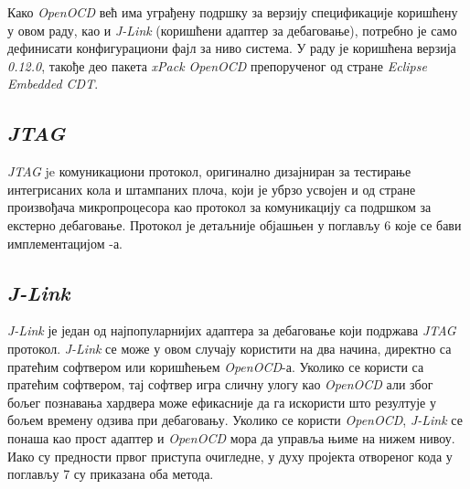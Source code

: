 Како \textit{Open\acrshort{OCD}} већ има уграђену подршку за верзију спецификације \cite{debug_spec} коришћену у овом раду, као и \textit{J-Link} (коришћени адаптер за дебаговање), потребно је само дефинисати конфигурациони фајл за ниво система. У раду је коришћена верзија \textit{0.12.0}, такође део пакета \textit{xPack OpenOCD} препорученог од стране \textit{Eclipse Embedded CDT}.

\subsection{\textit{\acrshort{JTAG}}}

\textit{\acrfull{JTAG}} \cite{jtag_spec} je комуникациони протокол, оригинално дизајниран за тестирање интегрисаних кола и штампаних плоча, који је убрзо усвојен и од стране произвођача микропроцесора као протокол за комуникацију са подршком за екстерно дебаговање. Протокол је детаљније објашњен у поглављу 6 које се бави имплементацијом -а.\newpage

\subsection{\textit{J-Link}}

\textit{J-Link} \cite{jlink} је један од најпопуларнијих адаптера за дебаговање који подржава \textit{\acrshort{JTAG}} протокол.
\textit{J-Link} се може у овом случају користити на два начина, директно са пратећим софтвером или коришћењем \textit{Open\acrshort{OCD}}-а. Уколико се користи са пратећим софтвером, тај софтвер игра сличну улогу као \textit{Open\acrshort{OCD}} али због бољег познавања хардвера може ефикасније да га искористи што резултује у бољем времену одзива при дебаговању. Уколико се користи \textit{Open\acrshort{OCD}}, \textit{J-Link} се понаша као прост адаптер и \textit{Open\acrshort{OCD}} мора да управља њиме на нижем нивоу. Иако су предности првог приступа очигледне, у духу пројекта отвореног кода у поглављу 7 су приказана оба метода.